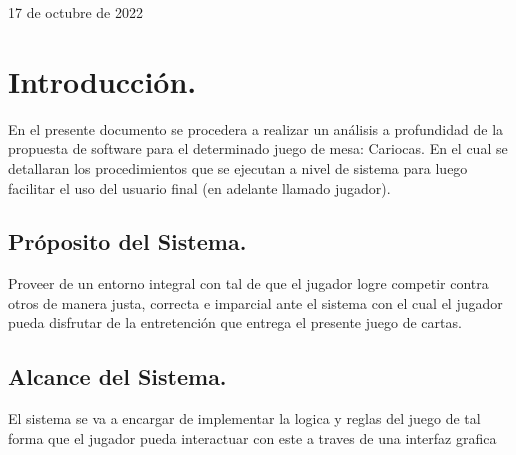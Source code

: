 \documentclass[60pt]{article}
\newcommand{\Date}{17 de octubre de 2022}%
\begin{document}
\begin{center}
\begin{minipage}{0.52\textwidth}
\begin{flushright}
        \end{flushright}                                                                    %
    \end{minipage}
    \vspace*{1cm}
    \vspace*{\fill}
    \begin{center}
        {\large \Date}                                                                 %
    \end{center}
\end{center}

\newpage
\pagestyle{mypagestyle}
\tableofcontents

\newpage



\section{Introducción.}\label{cap:intro}

En el presente documento se procedera a realizar un análisis a profundidad de la propuesta de software para el determinado juego de mesa: Cariocas. En el cual se detallaran los procedimientos que se ejecutan a nivel de sistema para luego facilitar el uso del usuario final (en adelante llamado jugador).



\subsection{Próposito del Sistema.}\label{cap:proposito}
Proveer de un entorno integral con tal de que el jugador logre competir contra otros de manera justa, correcta e imparcial ante el sistema con el cual el jugador pueda disfrutar de la entretención que entrega el presente juego de cartas.

\subsection{Alcance del Sistema.}\label{cap:alcance}
El sistema se va a encargar de implementar la logica y reglas del juego de tal forma que el jugador pueda interactuar con este a traves de una interfaz grafica
\end{document}
